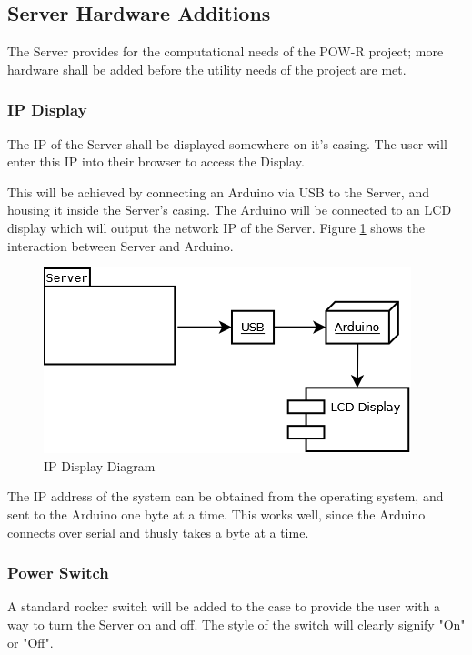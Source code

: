 
\subsection{Server Hardware Additions}

The Server provides for the computational needs of the \ac{POW-R} project; 
more hardware shall be added before the utility needs of the project are met.

\subsubsection{\ac{IP} Display}
The \ac{IP} of the Server shall be displayed somewhere on it's casing. 
The user will enter this \ac{IP} into their browser to access the Display.

This will be achieved by connecting an Arduino via \ac{USB} to the Server, and housing it inside the Server's casing. 
The Arduino will be connected to an \ac{LCD} display which will output the network \ac{IP} of the Server. 
Figure \ref{ArduinoLCD} shows the interaction between Server and Arduino.

\begin{figure}
\centering
\includegraphics[scale=0.5]{Hardware/images/ArduinoLCD.png}
\caption{\ac{IP} Display Diagram}
\label{ArduinoLCD}
\end{figure}

The \ac{IP} address of the system can be obtained from the operating system, and sent to the Arduino one byte at a time. 
This works well, since the Arduino connects over serial and thusly takes a byte at a time.

\subsubsection{Power Switch}
A standard rocker switch will be added to the case to provide the user with a way to turn the Server on and off. 
The style of the switch will clearly signify "On" or "Off".

